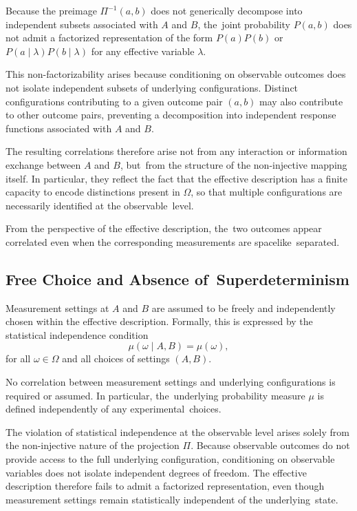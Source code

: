 \documentclass[11pt,a4paper]{article}
\theoremstyle{remark}
\begin{document}
    Because the preimage $\Pi^{-1}(a,b)$ does not generically decompose into independent
    subsets associated with $A$ and $B$, the~joint probability $P(a,b)$ does not admit a
    factorized representation of the form $P(a)P(b)$ or
    $P(a \mid \lambda) P(b \mid \lambda)$ for any effective variable $\lambda$.

    This non-factorizability arises because conditioning on observable outcomes does not
    isolate independent subsets of underlying configurations.
    Distinct configurations contributing to a given outcome pair $(a,b)$ may also
    contribute to other outcome pairs, preventing a decomposition into independent
    response functions associated with $A$ and $B$.

    The resulting correlations therefore arise not from any interaction or information
    exchange between $A$ and $B$, but~from the structure of the non-injective mapping
    itself.
    In particular, they reflect the fact that the effective description has a finite
    capacity to encode distinctions present in $\Omega$, so that multiple configurations
    are necessarily identified at the observable~level.

    From the perspective of the effective description, the~two outcomes appear correlated
    even when the corresponding measurements are spacelike~separated.

  \subsection{Free Choice and Absence of~Superdeterminism}
    \label{subsec:free-choice-and-absence-of-superdeterminism}

    Measurement settings at $A$ and $B$ are assumed to be freely and independently
    chosen within the effective description.
    Formally, this is expressed by the statistical independence condition
    \[
      \mu(\omega \mid A,B) = \mu(\omega),
    \]
    for all $\omega \in \Omega$ and all choices of settings $(A,B)$.

    No correlation between measurement settings and underlying configurations is
    required or assumed.
    In particular, the~underlying probability measure $\mu$ is defined independently
    of any experimental~choices.

    The violation of statistical independence at the observable level arises solely
    from the non-injective nature of the projection $\Pi$.
    Because observable outcomes do not provide access to the full underlying
    configuration, conditioning on observable variables does not isolate independent
    degrees of freedom.
    The effective description therefore fails to admit a factorized representation,
    even though measurement settings remain statistically independent of the
    underlying~state.
\end{document}
